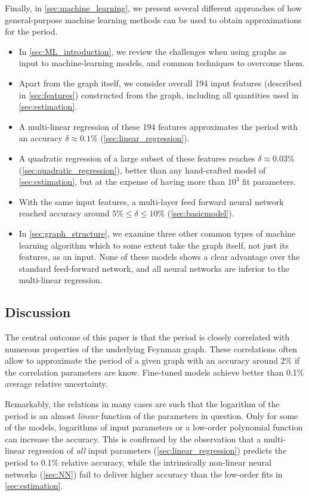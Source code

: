 \documentclass[12pt]{article}
\numberwithin{equation}{section}
\begin{document}
\medskip 
\noindent
Finally, in \cref{sec:machine_learning}, we present several different approaches of how general-purpose machine learning methods can be used to obtain  approximations for the period. 

\begin{itemize}
	\item In \cref{sec:ML_introduction}, we review the challenges when using graphs as input to machine-learning models, and common techniques to overcome them. 
	\item Apart from the graph itself, we consider overall  194 input features (described in \cref{sec:features}) constructed from the graph, including all quantities used in \cref{sec:estimation}.
	\item A multi-linear regression of these 194 features approximates the period with an accuracy $\delta \approx 0.1\%$ (\cref{sec:linear_regression}).
	\item A quadratic regression of a large subset of these features reaches $\delta \approx 0.03\%$ (\cref{sec:quadratic_regression}), better than any hand-crafted model of \cref{sec:estimation}, but at the expense of having more than $10^3$ fit parameters.
	\item With the same input features, a multi-layer feed forward neural network reached accuracy around $5\% \leq \delta \leq 10\%$ (\cref{sec:basicmodel}).
	\item In \cref{sec:graph_structure}, we examine three other common types of machine learning algorithm which to some extent take the graph itself, not just its features, as an input. None of these models shows a clear advantage over the standard feed-forward network, and all neural networks are inferior to the multi-linear regression.
\end{itemize}

	


\subsection{Discussion}\label{sec:discussion}

The central outcome of this paper is that the period is closely correlated with numerous properties of the underlying Feynman graph. These correlations often allow to approximate the period of a given graph with an accuracy around 2\% if the correlation parameters are know. Fine-tuned models achieve better than 0.1\% average relative uncertainty. 

Remarkably, the relations in many cases are such that the logarithm of the period is an  almost  \emph{linear} function of the parameters in question.  Only for some of the models,   logarithms of input parameters or a low-order polynomial function can increase the accuracy.  This is confirmed by the observation that a multi-linear regression of \emph{all} input parameters (\cref{sec:linear_regression})  predicts the period to 0.1\% relative accuracy, while the intrinsically non-linear neural networks (\cref{sec:NN}) fail to deliver higher accuracy than the low-order fits in \cref{sec:estimation}.
\end{document}
